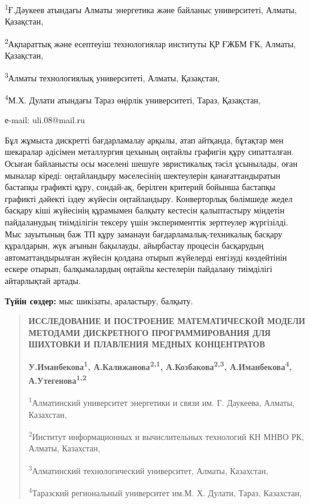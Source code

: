 \textsuperscript{1}Ғ.Дәукеев атындағы Алматы энергетика және байланыс
университеті, Алматы, Қазақстан,

\textsuperscript{2}Ақпараттық және есептеуіш технологиялар институты ҚР
ҒЖБМ ҒК, Алматы, Қазақстан,

\textsuperscript{3}Алматы технологиялық университеті, Алматы, Қазақстан,

\textsuperscript{4}М.Х. Дулати атындағы Тараз өңірлік университеті,
Тараз, Қазақстан,

е-mail: uli.08@mail.ru

Бұл жұмыста дискретті бағдарламалау арқылы, атап айтқанда, бұтақтар мен
шекаралар әдісімен металлургия цехының оңтайлы графигін құру
сипатталған. Осыған байланысты осы мәселені шешуге эвристикалық тәсіл
ұсынылады, оған мыналар кіреді: оңтайландыру мәселесінің шектеулерін
қанағаттандыратын бастапқы графикті құру, сондай-ақ, берілген критерий
бойынша бастапқы графикті дәйекті іздеу жүйесін оңтайландыру.
Конверторлық бөлімшеде жедел басқару кіші жүйесінің құрамымен балқыту
кестесін қалыптастыру міндетін пайдаланудың тиімділігін тексеру үшін
эксперименттік зерттеулер жүргізілді. Мыс зауытының баж ТП құру заманауи
бағдарламалық-техникалық басқару құралдарын, жүк ағынын бақылауды,
айырбастау процесін басқарудың автоматтандырылған жүйесін қолдана отырып
жүйелерді енгізуді көздейтінін ескере отырып, балқымалардың оңтайлы
кестелерін пайдалану тиімділігі айтарлықтай артады.

\textbf{Түйін сөздер:} мыс шикізаты, араластыру, балқыту.

\begin{quote}
\textbf{ИССЛЕДОВАНИЕ И ПОСТРОЕНИЕ МАТЕМАТИЧЕСКОЙ МОДЕЛИ МЕТОДАМИ
ДИСКРЕТНОГО ПРОГРАММИРОВАНИЯ ДЛЯ ШИХТОВКИ И ПЛАВЛЕНИЯ МЕДНЫХ
КОНЦЕНТРАТОВ}

\textbf{У.Иманбекова\textsuperscript{1},
А.Калижанова\textsuperscript{2,1}, А.Козбакова\textsuperscript{2,3},
А.Иманбекова\textsuperscript{4}, А.Утегенова\textsuperscript{1,2}}

\textsuperscript{1}Алматинский университет энергетики и связи им. Г.
Даукеева, Алматы, Казахстан,

\textsuperscript{2}Институт информационных и вычислительных технологий
КН МНВО РК, Алматы, Казахстан,

\textsuperscript{3}Алматинский технологический университет, Алматы,
Казахстан,

\textsuperscript{4}Таразский региональный университет им.М. Х. Дулати,
Тараз, Казахстан,
\end{quote}

